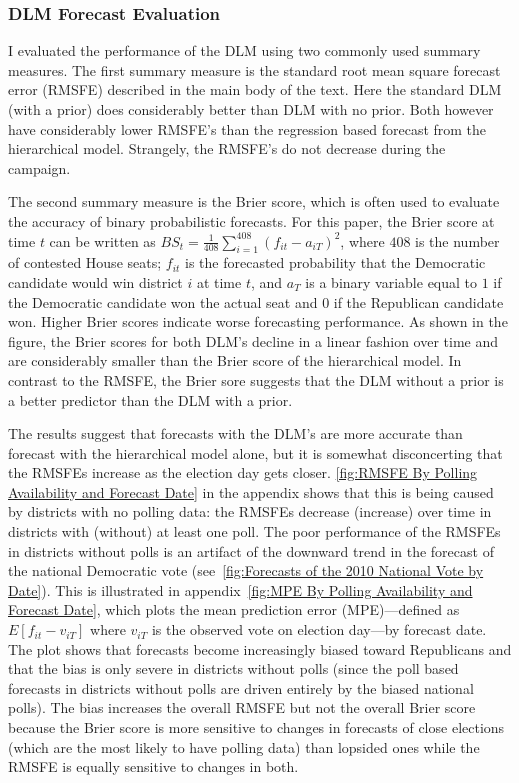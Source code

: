 \documentclass[12pt,final,fleqn]{article}
\theoremstyle{plain}
\begin{document}
\subsubsection{DLM Forecast Evaluation}\label{sec:dlm-forecast-eval}
I evaluated the performance of the DLM using two commonly used summary measures. The first summary measure is the standard root mean square forecast error (RMSFE) described in the main body of the text. Here the standard DLM (with a prior) does considerably better than DLM with no prior. Both however have considerably lower RMSFE's than the regression based forecast from the hierarchical model. Strangely, the RMSFE's do not decrease during the campaign.

The second summary measure is the Brier score, which is often used to evaluate the accuracy of binary probabilistic forecasts. For this paper, the Brier score at time $t$ can be written as $BS_t = \frac{1}{408} \sum_{i=1}^{408}(f_{it} - a_{iT})^2$, where $408$ is the number of contested House seats; $f_{it}$ is the forecasted probability that the Democratic candidate would win district $i$ at time $t$, and $a_T$ is a binary variable equal to $1$ if the Democratic candidate won the actual seat and $0$ if the Republican candidate won. Higher Brier scores indicate worse forecasting performance. As shown in the figure, the Brier scores for both DLM's decline in a linear fashion over time and are considerably smaller than the Brier score of the hierarchical model. In contrast to the RMSFE, the Brier sore suggests that the DLM without a prior is a better predictor than the DLM with a prior. 

The results suggest that forecasts with the DLM's are more accurate than forecast with the hierarchical model alone, but it is somewhat disconcerting that the RMSFEs increase as the election day gets closer. \autoref{fig:RMSFE By Polling Availability and Forecast Date} in the appendix shows that this is being caused by districts with no polling data: the RMSFEs decrease (increase) over time in districts with (without) at least one poll. The poor performance of the RMSFEs in districts without polls is an artifact of the downward trend in the forecast of the national Democratic vote (see~\autoref{fig:Forecasts of the 2010 National Vote by Date}). This is illustrated in appendix~\autoref{fig:MPE By Polling Availability and Forecast Date}, which plots the mean prediction error (MPE)---defined as $E[f_{it}-v_{iT}]$ where $v_{iT}$ is the observed vote on election day---by forecast date. The plot shows that forecasts become increasingly biased toward Republicans and that the bias is only severe in districts without polls (since the poll based forecasts in districts without polls are driven entirely by the biased national polls). The bias increases the overall RMSFE but not the overall Brier score because the Brier score is more sensitive to changes in forecasts of close elections (which are the most likely to have polling data) than lopsided ones while the RMSFE is equally sensitive to changes in both.
\end{document}
